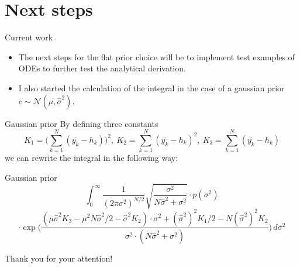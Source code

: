 \documentclass{beamer}
\newcommand{\s}{\sigma^2}
\newcommand{\sh}{\hat{\sigma}^2}
\begin{document}
\section{Next steps}

	\begin{frame}{Current work}
		\begin{itemize}
			\item The next steps for the flat prior choice will be to implement 
			test examples of ODEs to further test the analytical derivation.
			\item I also started the calculation of the integral in the case of a 
			gaussian prior $c  \sim \mathcal{N}(\mu, \hat{\sigma}^2)$.
		\end{itemize}
	\end{frame}

	\begin{frame}{Gaussian prior}
		By defining three constants
		\[
			K_1 = \biggl(\sum_{k = 1}^N (\overline{y_k} - h_k) \biggr)^2, \ K_2 
			= \sum_{k = 1}^N (\overline{y_k} - h_k)^2, \ K_3 = 
			\sum_{k = 1}^N (\overline{y_k} - h_k)
		\]
		we can rewrite the integral in the following way:
	\end{frame}

	\begin{frame}{Gaussian prior}
		\[
    		\int_0^{\infty} \frac{1}{(2\pi\s)^{N/2}} \sqrt{\frac{\s}{N\sh + \s}}
    		\cdot p(\s)
		\]
		\[
   			\cdot \exp \biggl(\frac{(\mu \sh K_3 - \mu^2 N \sh /2 - \sh K_2) \cdot 
   			\s + (\sh)^2 K_1 /2 - N (\sh)^2 K_2}{\s \cdot (N\sh + \s)} \biggr)
   		 	\, d\s
		\]
	\end{frame}
	
	\begin{frame}
		Thank you for your attention!
	\end{frame}
\end{document}
